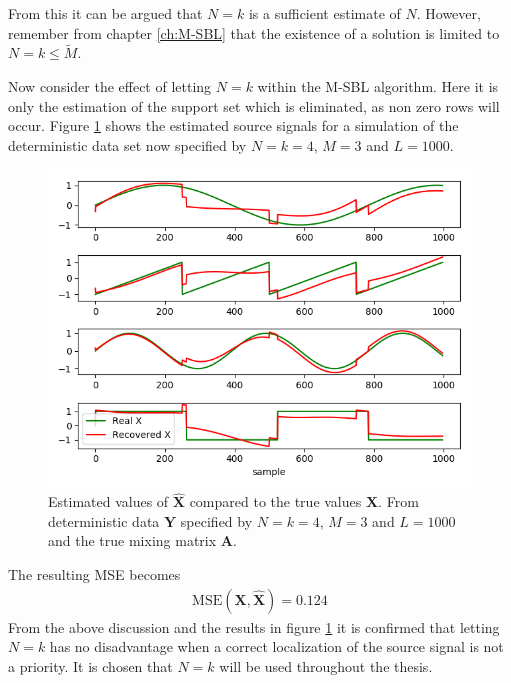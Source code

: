 From this it can be argued that $N = k$ is a sufficient estimate of $N$. 
However, remember from chapter \ref{ch:M-SBL} that the existence of a solution is limited to $N = k \leq \widetilde{M}$.

Now consider the effect of letting $N = k$ within the M-SBL algorithm. 
Here it is only the estimation of the support set which is eliminated, as non zero rows will occur. 
Figure \ref{fig:M-SBL_simple3} shows the estimated source signals for a simulation of the deterministic data set now specified by $N = k = 4$, $M = 3$ and $L = 1000$. 
\begin{figure}[H]
\centering
\includegraphics[scale=0.5]{figures/ch_6/M-SBL_simple3.png}
\caption{Estimated values of $\hat{\textbf{X}}$ compared to the true 				values $\textbf{X}$. From deterministic data $\textbf{Y}$ specified by $N=k=4$, $M = 3$ and $L=1000$  and the true mixing matrix $\mathbf{A}$.}
\label{fig:M-SBL_simple3}
\end{figure}
\noindent
The resulting MSE becomes
\begin{align*}
\text{MSE}(\mathbf{X}, \hat{\mathbf{X}}) = 0.124
\end{align*}
From the above discussion and the results in figure \ref{fig:M-SBL_simple3} it is confirmed that letting $N = k$ has no disadvantage when a correct localization of the source signal is not a priority. 
It is chosen that $N = k$ will be used throughout the thesis. 

